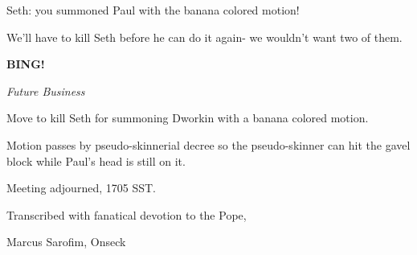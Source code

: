 \documentclass[12pt]{article}
\newcommand{\bing}{{\bf BING!} }
\newcommand{\goto}[1]{\bing \vskip 12pt \centerline{{\em{#1}}}}
\begin{document}
Seth: you summoned Paul with the banana colored motion!

We'll have to kill Seth before he can do it again- we wouldn't want two of them.

\goto{Future Business}

Move to kill Seth for summoning Dworkin with a banana colored motion.

Motion passes by pseudo-skinnerial decree so the pseudo-skinner can hit the gavel block while Paul's head is still on it.

\vspace{12pt}

\noindent
Meeting adjourned, 1705 SST.

\vspace{18pt}

\centerline{Transcribed with fanatical devotion to the Pope,}
\centerline{Marcus Sarofim, Onseck}
\end{document}
